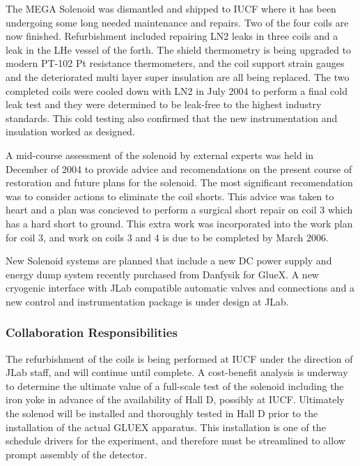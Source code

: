 The MEGA Solenoid was dismantled and shipped to IUCF where it has been 
undergoing some long needed maintenance and repairs. Two of the four
coils are now finished. Refurbishment included repairing LN2 leaks in three coils and a leak
in the LHe vessel of the forth. The shield thermometry is being upgraded to
modern PT-102 Pt resistance thermometers, and the coil support
strain gauges and the deteriorated multi layer super insulation are all being replaced.
The two completed coils were cooled down with
LN2 in July 2004 to perform a final cold leak test and they were
determined to be leak-free to the highest industry standards. This cold testing also 
confirmed that the new instrumentation and insulation worked as designed. 

A mid-course assessment of the solenoid by external experts was held in December of 2004 to
provide advice and recomendations on the present course of restoration and future 
plans for the solenoid. The most significant recomendation was to consider actions 
to eliminate the coil shorts. This advice was taken to heart and a plan was 
concieved to perform a surgical short repair on coil 3 which has a  
hard short to ground. This extra work was incorporated into the work plan for coil 3,
and work on coils 3 and 4 is due to be completed by March 2006.

New Solenoid systems are planned that include a new DC power
supply and energy dump system recently purchased from Danfysik for GlueX.
A new cryogenic interface with JLab compatible automatic valves and
connections and a new control and instrumentation package is under design at JLab.

\subsubsection*{Collaboration Responsibilities}

The refurbishment of the coils is being performed at IUCF under
the direction of JLab staff, and will continue until complete.
A cost-benefit analysis is underway to determine the ultimate value 
of a full-scale test of the solenoid including the iron yoke 
in advance of the availability of Hall D, possibly at IUCF.
Ultimately the solenod will be installed and thoroughly tested in Hall D 
prior to the installation of the actual GLUEX apparatus. This installation
is one of the schedule drivers for the experiment, and therefore must be 
streamlined to allow prompt assembly of the detector.